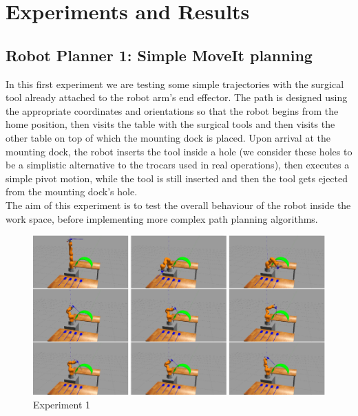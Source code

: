 \chapter{Experiments and Results}

\section{Robot Planner 1: Simple MoveIt planning}
\label{section:robot-planner1}

In this first experiment we are testing some simple trajectories with the surgical tool already attached to the robot arm's end effector.
The path is designed using the appropriate coordinates and orientations so that the robot begins from the home position, then visits the table with the surgical 
tools and then visits the other table on top of which the mounting dock is placed. Upon arrival at the mounting dock, the robot inserts the tool inside a hole
(we consider these holes to be a simplistic alternative to the trocars used in real operations), then executes a simple pivot motion, while the tool is still 
inserted and then the tool gets ejected from the mounting dock's hole.\\

The aim of this experiment is to test the overall behaviour of the robot inside the work space, before implementing more complex path planning algorithms.

\begin{center}
\begin{figure}[!htb]
\centering
\includegraphics[width=\textwidth]{images/robot_planner1.png}
\caption{Experiment 1}
\end{figure}
\end{center}

